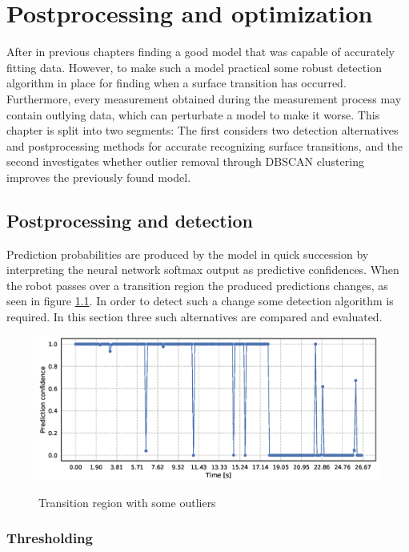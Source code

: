 \chapter{Postprocessing and optimization}

After in previous chapters finding a good model that was capable of accurately fitting data. However, to make such a model practical some robust detection algorithm in place for finding when a surface transition has occurred. Furthermore, every measurement obtained during the measurement process may contain outlying data, which can perturbate a model to make it worse. This chapter is split into two segments: The first considers two detection alternatives and postprocessing methods for accurate recognizing surface transitions, and the second investigates whether outlier removal through DBSCAN clustering improves the previously found model.

\section{Postprocessing and detection}

Prediction probabilities are produced by the model in quick succession by interpreting the neural network softmax output as predictive confidences. When the robot passes over a transition region the produced predictions changes, as seen in figure \ref{fig:detect_no}. In order to detect such a change some detection algorithm is required. In this section three such alternatives are compared and evaluated.  


\begin{figure}
	\includegraphics[scale=0.5]{figs_temp/detect_nothing}
	\label{fig:detect_no}
	\caption{Transition region with some outliers}
\end{figure}

\subsection{Thresholding}

